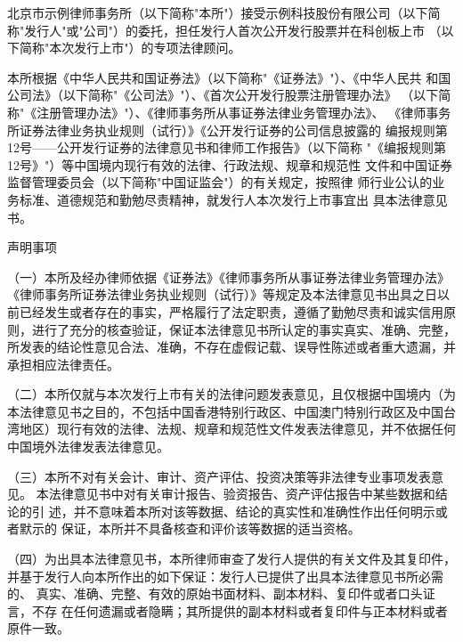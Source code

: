 \documentclass[zihao=-4]{ctexart}   %
\begin{document}
\opMakeCover
\setcounter{page}{2}      %
\optoc


北京市示例律师事务所（以下简称"本所"）接受示例科技股份有限公司（以下简
称"发行人"或"公司"）的委托，担任发行人首次公开发行股票并在科创板上市
（以下简称"本次发行上市"）的专项法律顾问。

本所根据《中华人民共和国证券法》（以下简称"《证券法》"）、《中华人民共
和国公司法》（以下简称"《公司法》"）、《首次公开发行股票注册管理办法》
（以下简称"《注册管理办法》"）、《律师事务所从事证券法律业务管理办法》、
《律师事务所证券法律业务执业规则（试行）》《公开发行证券的公司信息披露的
编报规则第12号——公开发行证券的法律意见书和律师工作报告》（以下简称
"《编报规则第12号》"）等中国境内现行有效的法律、行政法规、规章和规范性
文件和中国证券监督管理委员会（以下简称"中国证监会"）的有关规定，按照律
师行业公认的业务标准、道德规范和勤勉尽责精神，就发行人本次发行上市事宜出
具本法律意见书。

{\noindent\heiti{}声明事项\par}\vspace{0.3\baselineskip}

（一）本所及经办律师依据《证券法》《律师事务所从事证券法律业务管理办法》
《律师事务所证券法律业务执业规则（试行）》等规定及本法律意见书出具之日以
前已经发生或者存在的事实，严格履行了法定职责，遵循了勤勉尽责和诚实信用原
则，进行了充分的核查验证，保证本法律意见书所认定的事实真实、准确、完整，
所发表的结论性意见合法、准确，不存在虚假记载、误导性陈述或者重大遗漏，并
承担相应法律责任。

（二）本所仅就与本次发行上市有关的法律问题发表意见，且仅根据中国境内（为
本法律意见书之目的，不包括中国香港特别行政区、中国澳门特别行政区及中国台
湾地区）现行有效的法律、法规、规章和规范性文件发表法律意见，并不依据任何
中国境外法律发表法律意见。

（三）本所不对有关会计、审计、资产评估、投资决策等非法律专业事项发表意见。
本法律意见书中对有关审计报告、验资报告、资产评估报告中某些数据和结论的引
述，并不意味着本所对该等数据、结论的真实性和准确性作出任何明示或者默示的
保证，本所并不具备核查和评价该等数据的适当资格。

（四）为出具本法律意见书，本所律师审查了发行人提供的有关文件及其复印件，
并基于发行人向本所作出的如下保证：发行人已提供了出具本法律意见书所必需的、
真实、准确、完整、有效的原始书面材料、副本材料、复印件或者口头证言，不存
在任何遗漏或者隐瞒；其所提供的副本材料或者复印件与正本材料或者原件一致。
\end{document}
